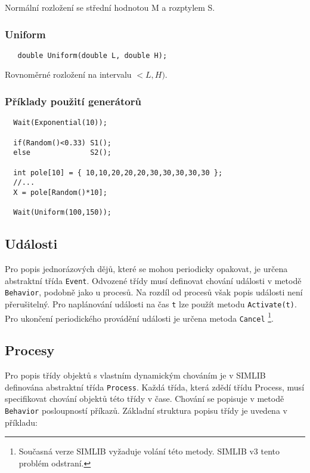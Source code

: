 \documentclass[a4paper]{article}
\begin{document}
Normální rozložení se střední hodnotou  M  a rozptylem  S.

\subsubsection{Uniform}

\begin{verbatim}
   double Uniform(double L, double H);
\end{verbatim}

Rovnoměrné rozložení na intervalu $<L,H)$.


\subsubsection{Příklady použití generátorů}

\begin{verbatim}
  Wait(Exponential(10));

  if(Random()<0.33) S1();
  else              S2();

  int pole[10] = { 10,10,20,20,20,30,30,30,30,30 };
  //...
  X = pole[Random()*10];

  Wait(Uniform(100,150));
\end{verbatim}



\subsection{Události}

Pro popis jednorázových dějů, které se mohou periodicky
opakovat, je určena abstraktní třída \verb|Event|. Odvozené třídy 
musí definovat chování události v metodě
\verb|Behavior|, podobně jako u procesů. Na rozdíl od procesů však
popis události není přerušitelný. Pro naplánování události na
čas \verb|t| lze použít metodu \verb|Activate(t)|.
Pro ukončení periodického provádění události je určena metoda \verb|Cancel|
\footnote{
Současná verze SIMLIB vyžaduje volání této metody. SIMLIB v3 tento problém
odstraní.
}.



\subsection{Procesy}

Pro popis třídy objektů s vlastním dynamickým chováním je
v SIMLIB definována abstraktní třída \verb|Process|. Každá třída, která
zdědí třídu Process, musí specifikovat chování objektů této
třídy v čase. Chování se popisuje v metodě \verb|Behavior| posloupností
příkazů. Základní struktura popisu třídy je uvedena v příkladu:
\end{document}
